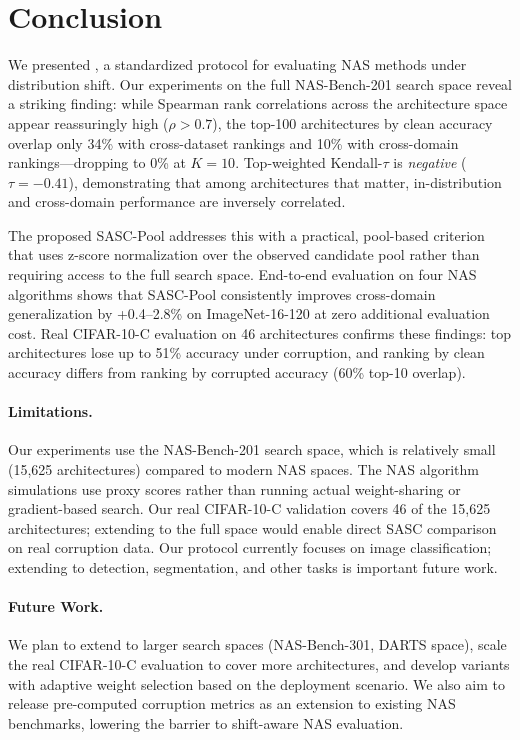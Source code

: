 \section{Conclusion}
\label{sec:conclusion}

We presented \method, a standardized protocol for evaluating NAS methods under distribution shift.
Our experiments on the full NAS-Bench-201 search space reveal a striking finding: while Spearman rank correlations across the architecture space appear reassuringly high ($\rho > 0.7$), the top-100 architectures by clean accuracy overlap only 34\% with cross-dataset rankings and 10\% with cross-domain rankings---dropping to 0\% at $K{=}10$.
Top-weighted Kendall-$\tau$ is \emph{negative} ($\tau = -0.41$), demonstrating that among architectures that matter, in-distribution and cross-domain performance are inversely correlated.

The proposed SASC-Pool addresses this with a practical, pool-based criterion that uses z-score normalization over the observed candidate pool rather than requiring access to the full search space.
End-to-end evaluation on four NAS algorithms shows that SASC-Pool consistently improves cross-domain generalization by +0.4--2.8\% on ImageNet-16-120 at zero additional evaluation cost.
Real CIFAR-10-C evaluation on 46 architectures confirms these findings: top architectures lose up to 51\% accuracy under corruption, and ranking by clean accuracy differs from ranking by corrupted accuracy (60\% top-10 overlap).

\paragraph{Limitations.}
Our experiments use the NAS-Bench-201 search space, which is relatively small (15,625 architectures) compared to modern NAS spaces.
The NAS algorithm simulations use proxy scores rather than running actual weight-sharing or gradient-based search.
Our real CIFAR-10-C validation covers 46 of the 15,625 architectures; extending to the full space would enable direct SASC comparison on real corruption data.
Our protocol currently focuses on image classification; extending to detection, segmentation, and other tasks is important future work.

\paragraph{Future Work.}
We plan to extend \method to larger search spaces (NAS-Bench-301, DARTS space), scale the real CIFAR-10-C evaluation to cover more architectures, and develop \sasc variants with adaptive weight selection based on the deployment scenario.
We also aim to release pre-computed corruption metrics as an extension to existing NAS benchmarks, lowering the barrier to shift-aware NAS evaluation.

